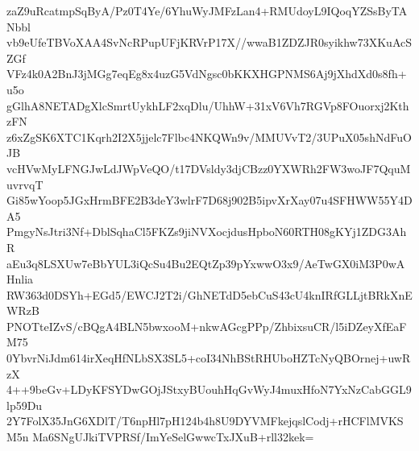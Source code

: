 zaZ9uRcatmpSqByA/Pz0T4Ye/6YhuWyJMFzLan4+RMUdoyL9IQoqYZSsByTANbbl
vb9eUfeTBVoXAA4SvNcRPupUFjKRVrP17X//wwaB1ZDZJR0syikhw73XKuAcSZGf
VFz4k0A2BnJ3jMGg7eqEg8x4uzG5VdNgsc0bKKXHGPNMS6Aj9jXhdXd0s8fh+u5o
gGlhA8NETADgXlcSmrtUykhLF2xqDlu/UhhW+31xV6Vh7RGVp8FOuorxj2KthzFN
z6xZgSK6XTC1Kqrh2I2X5jjelc7Flbc4NKQWn9v/MMUVvT2/3UPuX05shNdFuOJB
vcHVwMyLFNGJwLdJWpVeQO/t17DVsldy3djCBzz0YXWRh2FW3woJF7QquMuvrvqT
Gi85wYoop5JGxHrmBFE2B3deY3wlrF7D68j902B5ipvXrXay07u4SFHWW55Y4DA5
PmgyNsJtri3Nf+DblSqhaCl5FKZs9jiNVXocjdusHpboN60RTH08gKYj1ZDG3AhR
aEu3q8LSXUw7eBbYUL3iQcSu4Bu2EQtZp39pYxwwO3x9/AeTwGX0iM3P0wAHnlia
RW363d0DSYh+EGd5/EWCJ2T2i/GhNETdD5ebCuS43cU4knIRfGLLjtBRkXnEWRzB
PNOTteIZvS/cBQgA4BLN5bwxooM+nkwAGcgPPp/ZhbixsuCR/l5iDZeyXfEaFM75
0YbvrNiJdm614irXeqHfNLbSX3SL5+coI34NhBStRHUboHZTcNyQBOrnej+uwRzX
4++9beGv+LDyKFSYDwGOjJStxyBUouhHqGvWyJ4muxHfoN7YxNzCabGGL9lp59Du
2Y7FolX35JnG6XDlT/T6npHl7pH124b4h8U9DYVMFkejqslCodj+rHCFlMVKSM5n
Ma6SNgUJkiTVPRSf/ImYeSelGwwcTxJXuB+rll32kek=
